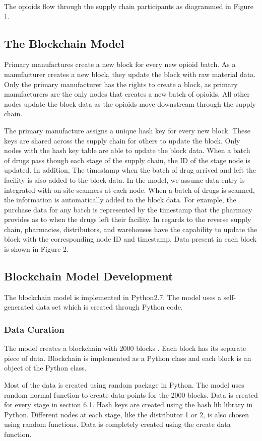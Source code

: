 \documentclass[sigconf]{acmart}
\begin{document}
The opioids flow through the supply chain participants as diagrammed in Figure 1.

\subsection{The Blockchain Model}
Primary manufactures create a new block for every new opioid batch. As a manufacturer creates a new block, they update the block with raw material data. Only the primary manufacturer has the rights to create a block, as primary manufacturers are the only nodes that creates a new batch of opioids. All other nodes update the block data as the opioids move downstream through the supply chain.

The primary manufacture assigns a unique hash key for every new block. These keys are shared across the supply chain for others to update the block. Only nodes with the hash key table are able to update the block data. When a batch of drugs pass though each stage of the supply chain, the ID of the stage node is updated. In addition, The timestamp when the batch of drug arrived and left the facility is also added to the block data. In the model, we assume data entry is integrated with on-site scanners at each node. When a batch of drugs is scanned, the information is automatically added to the block data. For example, the purchase data for any batch is represented by the timestamp that the pharmacy provides as to when the drugs left their facility. In regards to the reverse supply chain, pharmacies, distributors, and warehouses have the capability to update the block with the corresponding node ID and timestamp. Data present in each block is shown in Figure 2.


\subsection{Blockchain Model Development} The blockchain model is implemented in Python2.7. The model uses a self-generated data set which is created through Python code.

\subsubsection{Data Curation} The model creates a blockchain with 2000 blocks \cite{Kumar02}. Each block has its separate piece of data. Blockchain is implemented as a Python class and each block is an object of the Python class.

Most of the data is created using random package in Python. The model uses random normal function to create data points for the 2000 blocks. Data is created for every stage in section 6.1. Hash keys are created using the hash lib library in Python. Different nodes at each stage, like the distributor 1 or 2, is also chosen using random functions. Data is completely created using the create data function. 
\end{document}
